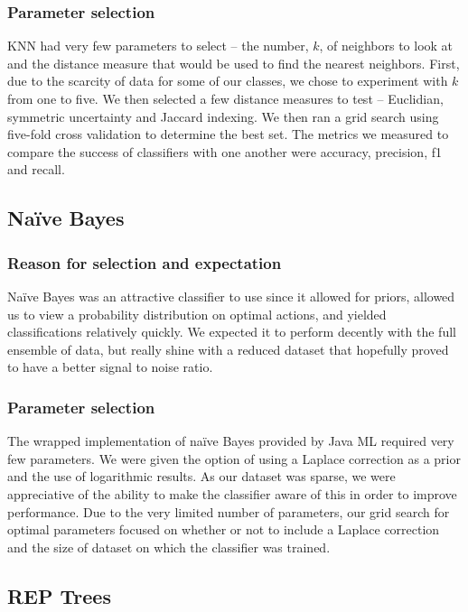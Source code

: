 \documentclass[]{article}   %
\begin{document}
\subsubsection{Parameter selection}
KNN had very few parameters to select – the number, $k$, of neighbors to look at and the distance measure that would 
be used to find the nearest neighbors. First, due to the scarcity of data for some of our classes, we chose to 
experiment with $k$ from one to five. We then selected a few distance measures to test – Euclidian, symmetric uncertainty 
and Jaccard indexing. We then ran a grid search using five-fold cross validation to determine the best set. The metrics 
we measured to compare the success of classifiers with one another were accuracy, precision, f1 and recall. 


\subsection{Na\"{i}ve Bayes}
\subsubsection{Reason for selection and expectation}
Na\"{i}ve Bayes was an attractive classifier to use since it allowed for priors, allowed us to view a probability 
distribution on optimal actions, and yielded classifications relatively quickly. We expected it to perform decently 
with the full ensemble of data, but really shine with a reduced dataset that hopefully proved to have a better 
signal to noise ratio. 

\subsubsection{Parameter selection}
The wrapped implementation of na\"{i}ve Bayes provided by Java ML required very few parameters. We were given the 
option of using a Laplace correction as a prior and the use of logarithmic results. As our dataset was sparse, we 
were appreciative of the ability to make the classifier aware of this in order to improve performance. Due to the 
very limited number of parameters, our grid search for optimal parameters focused on whether or not to include a 
Laplace correction and the size of dataset on which the classifier was trained. 

\subsection{REP Trees}
\end{document}
